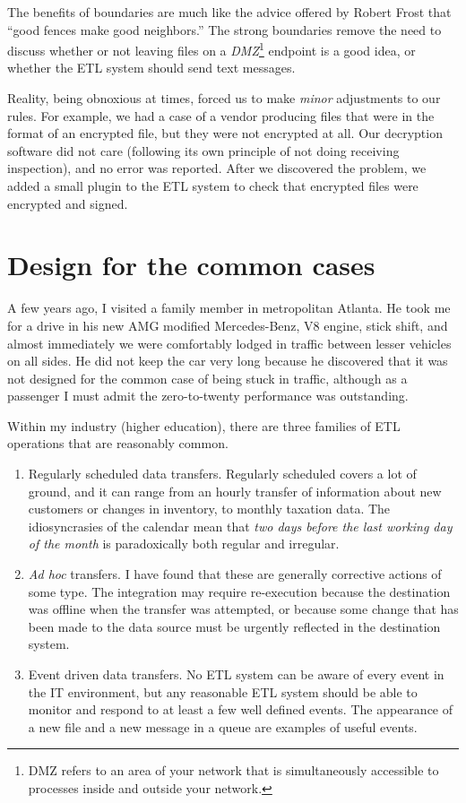 \documentclass[11pt,letterpaper,twosided]{memoir}
\begin{document}
The benefits of boundaries are much like the advice offered by
Robert Frost that ``good fences make good neighbors.'' The strong
boundaries remove the need to discuss whether or not leaving files
on a \emph{DMZ}\footnote{DMZ refers to an area of your network that
is simultaneously accessible to processes inside and outside your
network.} endpoint is a good idea, or whether the ETL system should
send text messages.

Reality, being obnoxious at times, forced us to make \emph{minor}
adjustments to our rules. For example, we had a case of a vendor
producing files that were in the format of an encrypted file, but
they were not encrypted at all.  Our decryption software did not
care (following its own principle of not doing receiving inspection),
and no error was reported. After we discovered the problem, we added
a small plugin to the ETL system to check that encrypted files were
encrypted and signed.

\section{Design for the common cases}

A few years ago, I visited a family member in metropolitan Atlanta.
He took me for a drive in his new AMG modified Mercedes-Benz, V8
engine, stick shift, and almost immediately we were comfortably
lodged in traffic between lesser vehicles on all sides. He did not
keep the car very long because he discovered that it was not designed
for the common case of being stuck in traffic, although as a passenger
I must admit the zero-to-twenty performance was outstanding.

Within my industry (higher education), there are three families of
ETL operations that are reasonably common.

\begin{enumerate}
\item Regularly scheduled data transfers. Regularly scheduled covers
a lot of ground, and it can range from an hourly transfer of information
about new customers or changes in inventory, to monthly taxation
data. The idiosyncrasies of the calendar mean that \emph{two days
before the last working day of the month} is paradoxically both regular
and irregular.

\item \emph{Ad hoc} transfers. I have found that these are generally
corrective actions of some type. The integration may require re-execution
because the destination was offline when the transfer was attempted,
or because some change that has been made to the data source must
be urgently reflected in the destination system.

\item Event driven data transfers. No ETL system can be aware of every
event in the IT environment, but any reasonable ETL system should 
be able to monitor and respond to at least a few well defined events. 
The appearance of a new file and a new message in a queue are examples
of useful events.

\end{enumerate}
\end{document}
